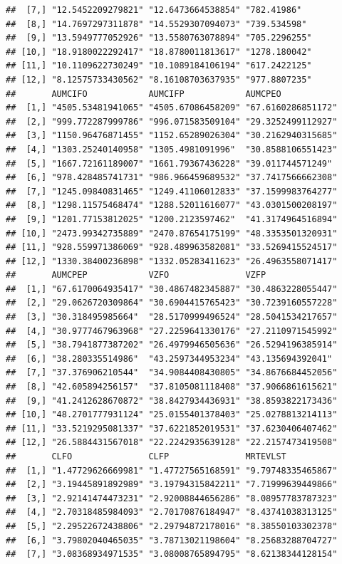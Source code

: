 \documentclass[]{krantz}
\theoremstyle{definition}
\theoremstyle{definition}
\theoremstyle{definition}
\theoremstyle{remark}
\begin{document}
\begin{verbatim}
##  [7,] "12.5452209279821" "12.6473664538854" "782.41986"   
##  [8,] "14.7697297311878" "14.5529307094073" "739.534598"  
##  [9,] "13.5949777052926" "13.5580763078894" "705.2296255" 
## [10,] "18.9180022292417" "18.8780011813617" "1278.180042" 
## [11,] "10.1109622730249" "10.1089184106194" "617.2422125" 
## [12,] "8.12575733430562" "8.16108703637935" "977.8807235" 
##       AUMCIFO            AUMCIFP            AUMCPEO           
##  [1,] "4505.53481941065" "4505.67086458209" "67.6160286851172"
##  [2,] "999.772287999786" "996.071583509104" "29.3252499112927"
##  [3,] "1150.96476871455" "1152.65289026304" "30.2162940315685"
##  [4,] "1303.25240140958" "1305.4981091996"  "30.8588106551423"
##  [5,] "1667.72161189007" "1661.79367436228" "39.011744571249" 
##  [6,] "978.428485741731" "986.966459689532" "37.7417566662308"
##  [7,] "1245.09840831465" "1249.41106012833" "37.1599983764277"
##  [8,] "1298.11575468474" "1288.52011616077" "43.0301500208197"
##  [9,] "1201.77153812025" "1200.2123597462"  "41.3174964516894"
## [10,] "2473.99342735889" "2470.87654175199" "48.3353501320931"
## [11,] "928.559971386069" "928.489963582081" "33.5269415524517"
## [12,] "1330.38400236898" "1332.05283411623" "26.4963558071417"
##       AUMCPEP            VZFO               VZFP              
##  [1,] "67.6170064935417" "30.4867482345887" "30.4863228055447"
##  [2,] "29.0626720309864" "30.6904415765423" "30.7239160557228"
##  [3,] "30.318495985664"  "28.5170999496524" "28.5041534217657"
##  [4,] "30.9777467963968" "27.2259641330176" "27.2110971545992"
##  [5,] "38.7941877387202" "26.4979946505636" "26.5294196385914"
##  [6,] "38.280335514986"  "43.2597344953234" "43.135694392041" 
##  [7,] "37.376906210544"  "34.9084408430805" "34.8676684452056"
##  [8,] "42.605894256157"  "37.8105081118408" "37.9066861615621"
##  [9,] "41.2412628670872" "38.8427934436931" "38.8593822173436"
## [10,] "48.2701777931124" "25.0155401378403" "25.0278813214113"
## [11,] "33.5219295081337" "37.6221852019531" "37.6230406407462"
## [12,] "26.5884431567018" "22.2242935639128" "22.2157473419508"
##       CLFO               CLFP               MRTEVLST          
##  [1,] "1.47729626669981" "1.47727565168591" "9.79748335465867"
##  [2,] "3.19445891892989" "3.19794315842211" "7.71999639449866"
##  [3,] "2.92141474473231" "2.92008844656286" "8.08957783787323"
##  [4,] "2.70318485984093" "2.70170876184947" "8.43741038313125"
##  [5,] "2.29522672438806" "2.29794872178016" "8.38550103302378"
##  [6,] "3.79802040465035" "3.78713021198604" "8.25683288704727"
##  [7,] "3.08368934971535" "3.08008765894795" "8.62138344128154"

\end{verbatim}
\end{document}
